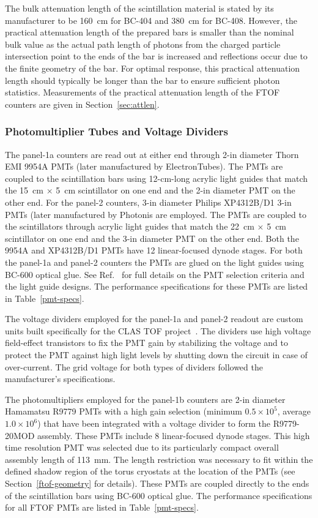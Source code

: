 \documentclass[final,3p,twocolumn]{elsarticle}
\begin{document}
The bulk attenuation length of the scintillation material is stated by its manufacturer to be 160~cm
for BC-404 and 380~cm for BC-408. However, the practical attenuation length of the prepared bars
is smaller than the nominal bulk value as the actual path length of photons from the charged particle
intersection point to the ends of the bar is increased and reflections occur due to the finite geometry
of the bar. For optimal response, this practical attenuation length should typically be longer than the
bar to ensure sufficient photon statistics. Measurements of the practical attenuation length of the
FTOF counters are given in Section~\ref{sec:attlen}.

\subsubsection{Photomultiplier Tubes and Voltage Dividers}

The panel-1a counters are read out at either end through 2-in diameter Thorn EMI 9954A PMTs (later
manufactured by ElectronTubes). The PMTs are coupled to the scintillation bars using 12-cm-long acrylic
light guides that match the 15~cm $\times$ 5~cm scintillator on one end and the 2-in diameter PMT on
the other end.  For the panel-2 counters, 3-in diameter Philips XP4312B/D1 3-in PMTs (later manufactured
by Photonis are employed. The PMTs are coupled to the scintillators through acrylic light guides that match
the 22~cm $\times$ 5~cm scintillator on one end and the 3-in diameter PMT on the other end. Both the
9954A and XP4312B/D1 PMTs have 12 linear-focused dynode stages. For both the panel-1a and panel-2
counters the PMTs are glued on the light guides using BC-600 optical glue. See Ref.~\cite{tof-nim} for
full details on the PMT selection criteria and the light guide designs. The performance specifications for
these PMTs are listed in Table~\ref{pmt-specs}.

The voltage dividers employed for the panel-1a and panel-2 readout are custom units built specifically
for the CLAS TOF project~\cite{tof-nim}. The dividers use high voltage field-effect transistors to fix
the PMT gain by stabilizing the voltage and to protect the PMT against high light levels by shutting down
the circuit in case of over-current. The grid voltage for both types of dividers followed the
manufacturer's specifications.

The photomultipliers employed for the panel-1b counters are 2-in diameter Hamamatsu R9779 PMTs with
a high gain selection (minimum $0.5 \times 10^5$, average $1.0 \times 10^6$) that have been integrated
with a voltage divider to form the R9779-20MOD assembly. These PMTs include 8 linear-focused dynode
stages. This high time resolution PMT was selected due to its particularly compact overall assembly length
of 113~mm. The length restriction was necessary to fit within the defined shadow region of the torus
cryostats at the location of the PMTs (see Section~\ref{ftof-geometry} for details). These PMTs are
coupled directly to the ends of the scintillation bars using BC-600 optical glue. The performance
specifications for all FTOF PMTs are listed in Table~\ref{pmt-specs}.
\end{document}
